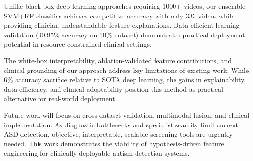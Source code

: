 \documentclass[conference]{IEEEtran}
\begin{document}
Unlike black-box deep learning approaches requiring 1000+ videos, our ensemble SVM+RF classifier achieves competitive accuracy with only 333 videos while providing clinician-understandable feature explanations. Data-efficient learning validation (90.95\% accuracy on 10\% dataset) demonstrates practical deployment potential in resource-constrained clinical settings.

The white-box interpretability, ablation-validated feature contributions, and clinical grounding of our approach address key limitations of existing work. While 6\% accuracy sacrifice relative to SOTA deep learning, the gains in explainability, data efficiency, and clinical adoptability position this method as practical alternative for real-world deployment.

Future work will focus on cross-dataset validation, multimodal fusion, and clinical implementation. As diagnostic bottlenecks and specialist scarcity limit current ASD detection, objective, interpretable, scalable screening tools are urgently needed. This work demonstrates the viability of hypothesis-driven feature engineering for clinically deployable autism detection systems.
\end{document}
